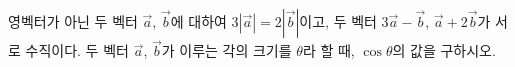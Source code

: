영벡터가 아닌 두 벡터 $\vec{a}$, $\vec{b}$에 대하여 $3|\vec{a}|=2|\vec{b}|$이고, 두 벡터 $3\vec{a}-\vec{b}$, $\vec{a}+2\vec{b}$가 서로 수직이다. 두 벡터 $\vec{a}$, $\vec{b}$가 이루는 각의 크기를 $\theta$라 할 때, $\cos\theta$의 값을 구하시오.
